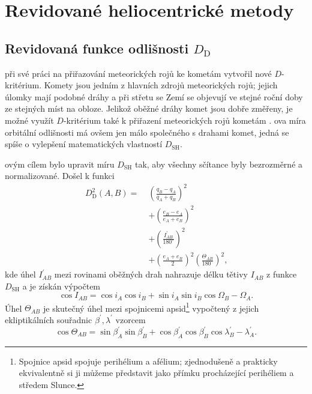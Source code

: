 \chapter{Revidované heliocentrické metody}%

\section{Revidovaná funkce odlišnosti $D_\text{D}$}%
\citeauthor{cometassoc} při své práci na přiřazování meteorických rojů ke kometám \cite{cometassoc} vytvořil nové $D$-kritérium. Komety jsou jedním z hlavních zdrojů meteorických rojů; jejich úlomky mají podobné dráhy a při střetu se Zemí se objevují ve stejné roční doby ze stejných míst na obloze. Jelikož oběžné dráhy komet jsou dobře změřeny, je možné využít $D$-kritérium také k přiřazení meteorických rojů kometám \cite{cometassoc}. \citeauthor{cometassoc}ova míra orbitální odlišnosti má ovšem jen málo společného s drahami komet, jedná se spíše o vylepšení matematických vlastností $D_\text{SH}$.

\citeauthor{cometassoc}ovým cílem bylo upravit míru $D_\text{SH}$ tak, aby všechny sčítance byly bezrozměrné a normalizované. Došel k funkci \cite{cometassoc}\cite{remarks}
\begin{equation}
    \begin{aligned}
        D_\text{D}^2(A,B)=\; & \left( \frac{q_B-q_A}{q_A+q_B} \right)^2                                                   \\
                             & +\left( \frac{e_B-e_A}{e_A+e_B} \right)^2                                                  \\
                             & +\left( \frac{I^\prime_{AB}}{180^\circ} \right)^2                                          \\
                             & +\left( \frac{e_A+e_B}{2} \right)^2\left( \frac{\Theta_{AB}}{180^\circ} \right)^2 \text{,}
    \end{aligned}
    \label{eqn:revised:d_d}
\end{equation}
kde úhel $I^\prime_{AB}$ mezi rovinami oběžných drah nahrazuje délku tětivy $I_{AB}$ z funkce $D_\text{SH}$ a je získán výpočtem \cite{cometassoc}
\begin{equation}
    \cos{I_{AB}}=\cos{i_A}\cos{i_B}+\sin{i_A}\sin{i_B}\cos{\Omega_B-\Omega_A}\text{.}
\end{equation}
Úhel $\Theta_{AB}$ je skutečný úhel mezi spojnicemi apsid\footnote{Spojnice apsid spojuje perihélium a afélium; zjednodušeně a prakticky ekvivalentně si ji můžeme představit jako přímku procházející perihéliem a středem Slunce.} vypočtený z jejich ekliptikálních souřadnic $\beta^\prime,\lambda^\prime$ vzorcem \cite{cometassoc}
\begin{equation}
    \cos{\Theta_{AB}}=\sin{\beta^\prime_A}\sin{\beta^\prime_B}+\cos{\beta^\prime_A}\cos{\beta^\prime_B}\cos{\lambda^\prime_B-\lambda^\prime_A} \text{.}
\end{equation}

